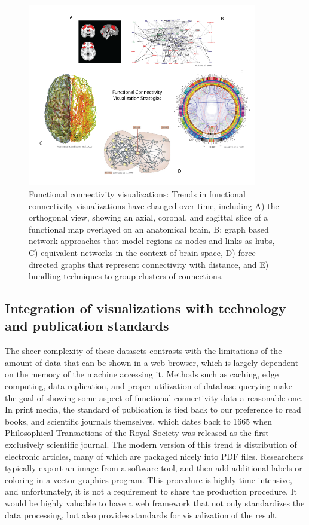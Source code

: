 \documentclass{report}
\begin{document}
\begin{figure}[h!]
\begin{center}
\includegraphics[width=10cm]{images/figure62.png}
\end{center}
\caption{ \label{fig:62} Functional connectivity visualizations:  Trends in functional connectivity visualizations have changed over time, including A) the orthogonal view, showing an axial, coronal, and sagittal slice of a functional map overlayed on an anatomical brain, B: graph based network approaches that model regions as nodes and links as hubs, C) equivalent networks in the context of brain space, D) force directed graphs that represent connectivity with distance, and E) bundling techniques to group clusters of connections.
 \newline \newline}
\end{figure} 


\subsection{Integration of visualizations with technology and publication standards}
The sheer complexity of these datasets contrasts with the limitations of the amount of data that can be shown in a web browser, which is largely dependent on the memory of the machine accessing it.  Methods such as caching, edge computing, data replication, and proper utilization of database querying make the goal of showing some aspect of functional connectivity data a reasonable one.  In print media, the standard of publication is tied back to our preference to read books, and scientific journals themselves, which dates back to 1665 when Philosophical Transactions of the Royal Society was released as the first exclusively scientific journal.  The modern version of this trend is distribution of electronic articles, many of which are packaged nicely into PDF files.  Researchers typically export an image from a software tool, and then add additional labels or coloring in a vector graphics program.  This procedure is highly time intensive, and unfortunately, it is not a requirement to share the production procedure.  It would be highly valuable to have a web framework that not only standardizes the data processing, but also provides standards for visualization of the result.   
\end{document}
